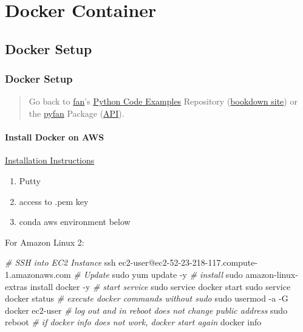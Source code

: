 \documentclass[
]{book}
\newenvironment{Shaded}{\begin{snugshade}}{\end{snugshade}}
\newcommand{\CommentTok}[1]{\textcolor[rgb]{0.56,0.35,0.01}{\textit{#1}}}
\newcommand{\ExtensionTok}[1]{#1}
\newcommand{\FunctionTok}[1]{\textcolor[rgb]{0.00,0.00,0.00}{#1}}
\newcommand{\NormalTok}[1]{#1}
\providecommand{\tightlist}{%
  \setlength{\itemsep}{0pt}\setlength{\parskip}{0pt}}
\begin{document}
\hypertarget{docker-container}{%
\chapter{Docker Container}\label{docker-container}}

\hypertarget{docker-setup}{%
\section{Docker Setup}\label{docker-setup}}

\hypertarget{docker-setup-1}{%
\subsection{Docker Setup}\label{docker-setup-1}}

\begin{quote}
Go back to \href{http://fanwangecon.github.io/}{fan}'s \href{https://fanwangecon.github.io/Py4Econ/}{Python Code Examples} Repository (\href{https://fanwangecon.github.io/Py4Econ/bookdown}{bookdown site}) or the \href{https://pyfan.readthedocs.io/en/latest/}{pyfan} Package (\href{https://pyfan.readthedocs.io/en/latest/reference.html}{API}).
\end{quote}

\hypertarget{install-docker-on-aws}{%
\subsubsection{Install Docker on AWS}\label{install-docker-on-aws}}

\href{https://docs.aws.amazon.com/AmazonECS/latest/developerguide/docker-basics.html}{Installation Instructions}

\begin{enumerate}
\def\labelenumi{\arabic{enumi}.}
\tightlist
\item
  Putty
\item
  access to .pem key
\item
  conda aws environment below
\end{enumerate}

For Amazon Linux 2:

\begin{Shaded}
\begin{Highlighting}[]
\CommentTok{\# SSH into EC2 Instance}
\FunctionTok{ssh}\NormalTok{ ec2{-}user@ec2{-}52{-}23{-}218{-}117.compute{-}1.amazonaws.com}
\CommentTok{\# Update}
\FunctionTok{sudo}\NormalTok{ yum update {-}y}
\CommentTok{\# install}
\FunctionTok{sudo}\NormalTok{ amazon{-}linux{-}extras install docker {-}y}
\CommentTok{\# start service}
\FunctionTok{sudo}\NormalTok{ service docker start}
\FunctionTok{sudo}\NormalTok{ service docker status}
\CommentTok{\# execute docker commands without sudo}
\FunctionTok{sudo}\NormalTok{ usermod {-}a {-}G docker ec2{-}user}
\CommentTok{\# log out and in reboot does not change public address}
\FunctionTok{sudo}\NormalTok{ reboot}
\CommentTok{\# if docker info does not work, docker start again}
\ExtensionTok{docker}\NormalTok{ info}
\end{Highlighting}
\end{Shaded}
\end{document}
